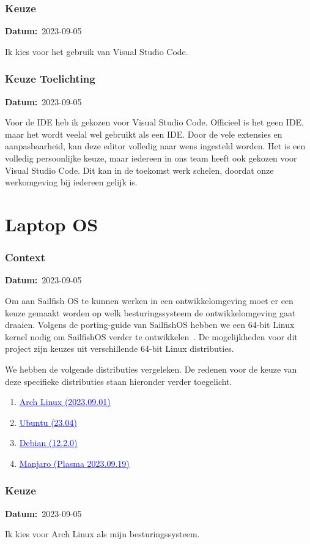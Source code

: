 \documentclass[a4paper]{report}
\newcommand{\styledhref}[2]{%
    \href{#1}{\textcolor{blue}{\underline{#2}}} %
}
\newcommand{\personalbox}{
  \begin{tcolorbox}[hbox, colback=green!5!white,colframe=green!75!black,
    left=.1mm, right=.1mm, top=.1mm, bottom=.1mm, fontupper=\scriptsize\sffamily]
    Persoonlijke Keuze
  \end{tcolorbox}
}
\newcommand{\personalchoice}[1]{
  \section[ #1 ]{#1~\mbox{\raisebox{-2.5pt}{\personalbox}}}
}
\newcommand{\timestamp}[1]{
  \mbox{\scriptsize \textbf{Datum:} #1} \smallbreak
}
\begin{document}
\subsubsection{Keuze}
\timestamp{2023-09-05}
Ik kies voor het gebruik van Visual Studio Code.


\subsubsection{Keuze Toelichting}
\timestamp{2023-09-05}
Voor de IDE heb ik gekozen voor Visual Studio Code. Officieel is het geen IDE, maar het wordt veelal wel gebruikt als een IDE. 
Door de vele extensies en aanpasbaarheid, kan deze editor volledig naar wens ingesteld worden. 
Het is een volledig persoonlijke keuze, maar iedereen in ons team heeft ook gekozen voor Visual Studio Code.
Dit kan in de toekomst werk schelen, doordat onze werkomgeving bij iedereen gelijk is.

\personalchoice{Laptop OS}
\subsubsection{Context}
\timestamp{2023-09-05}
Om aan Sailfish OS te kunnen werken in een ontwikkelomgeving moet er een keuze gemaakt worden op welk besturingssysteem de ontwikkelomgeving gaat draaien. 
Volgens de porting-guide van SailfishOS hebben we een 64-bit Linux kernel nodig om SailfishOS verder te ontwikkelen~\cite{sailfishportingguide}.
De mogelijkheden voor dit project zijn keuzes uit verschillende 64-bit Linux distributies. 

We hebben de volgende distributies vergeleken. De redenen voor de keuze van deze specifieke distributies staan hieronder verder toegelicht.
\begin{enumerate}
  \item \styledhref{https://archlinux.org/}{Arch Linux (2023.09.01)}
  \item \styledhref{https://ubuntu.com/}{Ubuntu (23.04)}
  \item \styledhref{https://www.debian.org/}{Debian (12.2.0)}
  \item \styledhref{https://manjaro.org/}{Manjaro (Plasma 2023.09.19)}
\end{enumerate}

\subsubsection{Keuze}
\timestamp{2023-09-05}
Ik kies voor Arch Linux als mijn besturingssysteem.
\end{document}
